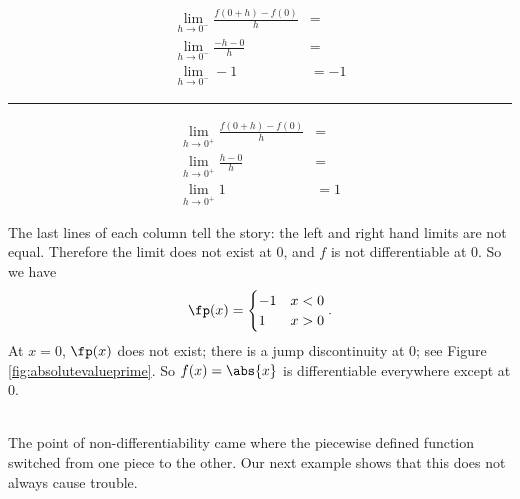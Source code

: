{\noindent\begin{minipage}[b]{.49\linewidth}
\begin{align*}
\lim_{h\to0^-}\frac{f(0+h)-f(0)}{h} &= \\
\lim_{h\to0^-}\frac{-h-0}{h} &= \\
\lim_{h\to0^-}-1 & =-1
\end{align*}
\end{minipage}\rule{.5pt}{70pt}%
\begin{minipage}[b]{.49\linewidth}
\begin{align*}
\lim_{h\to0^+}\frac{f(0+h)-f(0)}{h} &= \\
\lim_{h\to0^+}\frac{h-0}{h} &= \\
\lim_{h\to0^+}1 & =1
\end{align*}
\end{minipage}
%		
%		

\noindent
The last lines of each column tell the story: the left and right hand limits are not equal. Therefore the limit does not exist at 0, and $f$ is not differentiable at 0.
So we have $$\fp(x) = \begin{cases} -1 & x<0 \\ 1 & x>0\end{cases}.$$ 
At $x=0$, $\fp(x)$ does not exist; there is a jump discontinuity at 0; see Figure \ref{fig:absolutevalueprime}. So $f(x) = \abs{x}$ is differentiable everywhere except at 0.}\\

The point of non-differentiability came where the piecewise defined function switched from one piece to the other. Our next example shows that this does not always cause trouble.\\

